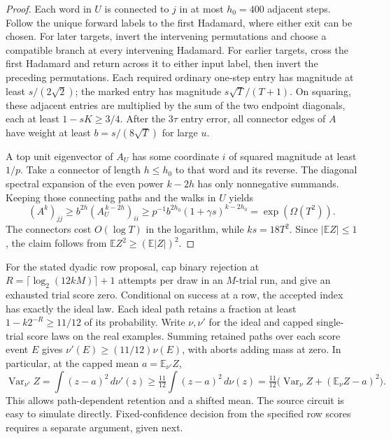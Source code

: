 \documentclass[11pt]{article}
\begin{document}
\begin{proof}
Each word in \(U\) is connected to \(j\) in at most \(h_0=400\) adjacent steps. Follow the unique forward labels to the first Hadamard, where either exit can be chosen. For later targets, invert the intervening permutations and choose a compatible branch at every intervening Hadamard. For earlier targets, cross the first Hadamard and return across it to either input label, then invert the preceding permutations. Each required ordinary one-step entry has magnitude at least \(s/(2\sqrt2)\); the marked entry has magnitude \(s\sqrt T/(T+1)\). On squaring, these adjacent entries are multiplied by the sum of the two endpoint diagonals, each at least \(1-sK\ge3/4\). After the \(3\tau\) entry error, all connector edges of \(A\) have weight at least \(b=s/(8\sqrt T)\) for large \(u\).

A top unit eigenvector of \(A_U\) has some coordinate \(i\) of squared magnitude at least \(1/p\). Take a connector of length \(h\le h_0\) to that word and its reverse. The diagonal spectral expansion of the even power \(k-2h\) has only nonnegative summands. Keeping those connecting paths and the walks in \(U\) yields
\[
 (A^k)_{jj}\ge b^{2h}(A_U^{\,k-2h})_{ii}
 \ge p^{-1} b^{2h_0}(1+\gamma s)^{k-2h_0}=\exp(\Omega(T^2)).
\]
The connectors cost \(O(\log T)\) in the logarithm, while \(ks=18T^2\). Since \(|\mathbb E Z|\le1\), the claim follows from \(\mathbb E Z^2\ge(\mathbb E|Z|)^2\).
\end{proof}
For the stated dyadic row proposal, cap binary rejection at \(R=\lceil\log_2(12kM)\rceil+1\) attempts per draw in an \(M\)-trial run, and give an exhausted trial score zero. Conditional on success at a row, the accepted index has exactly the ideal law. Each ideal path retains a fraction at least \(1-k2^{-R}\ge11/12\) of its probability. Write \(\nu,\nu'\) for the ideal and capped single-trial score laws on the real examples. Summing retained paths over each score event \(E\) gives \(\nu'(E)\ge(11/12)\nu(E)\), with aborts adding mass at zero. In particular, at the capped mean \(a=\mathbb E_{\nu'} Z\),
\[
 \operatorname{Var}_{\nu'}Z=\int(z-a)^2\,d\nu'(z)
 \ge \tfrac{11}{12}\int(z-a)^2\,d\nu(z)
 = \tfrac{11}{12}\big(\operatorname{Var}_{\nu}Z+(\mathbb E_\nu Z-a)^2\big).
\]
This allows path-dependent retention and a shifted mean. The source circuit is easy to simulate directly. Fixed-confidence decision from the specified row scores requires a separate argument, given next.
\end{document}
